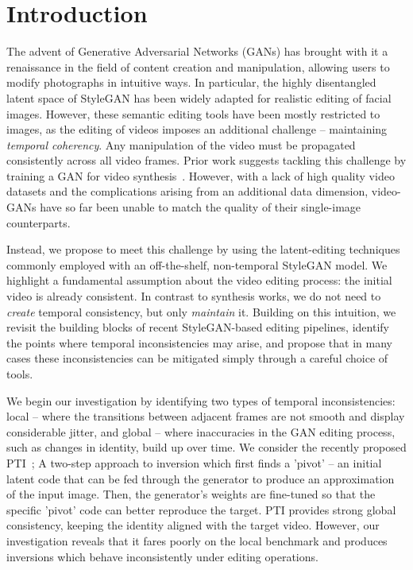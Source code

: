 \section{Introduction}

The advent of Generative Adversarial Networks (GANs) has brought with it a renaissance in the field of content creation and manipulation, allowing users to modify photographs in intuitive ways. In particular, the highly disentangled latent space of StyleGAN \cite{karras2019style,karras2020analyzing} has been widely adapted for realistic editing of facial images. However, these semantic editing tools have been mostly restricted to images, as the editing of videos imposes an additional challenge -- maintaining \textit{temporal coherency}. Any manipulation of the video must be propagated consistently across all video frames. Prior work suggests tackling this challenge by training a GAN for video synthesis~\cite{skorokhodov2021stylegan,yan2021videogpt,yu2022generating}. However, with a lack of high quality video datasets and the complications arising from an additional data dimension, video-GANs have so far been unable to match the quality of their single-image counterparts. 

Instead, we propose to meet this challenge by using the latent-editing techniques commonly employed with an off-the-shelf, non-temporal StyleGAN model.
We highlight a fundamental assumption about the video editing process: the initial video is already consistent. In contrast to synthesis works, we do not need to \textit{create} temporal consistency, but only \textit{maintain} it. Building on this intuition, we revisit the building blocks of recent StyleGAN-based editing pipelines, identify the points where temporal inconsistencies may arise, and propose that in many cases these inconsistencies can be mitigated simply through a careful choice of tools. 

We begin our investigation by identifying two types of temporal inconsistencies: local -- where the transitions between adjacent frames are not smooth and display considerable jitter, and global -- where inaccuracies in the GAN editing process, such as changes in identity, build up over time.
We consider the recently proposed PTI~\cite{roich2021pivotal}; A two-step approach to inversion which first finds a 'pivot' -- an initial latent code that can be fed through the generator to produce an approximation of the input image. Then, the generator's weights are fine-tuned so that the specific 'pivot' code can better reproduce the target. PTI provides strong global consistency, keeping the identity aligned with the target video. However, our investigation reveals that it fares poorly on the local benchmark and produces inversions which behave inconsistently under editing operations.

